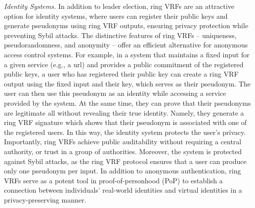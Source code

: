 \smallskip
\emph{Identity Systems.} In addition to leader election, ring VRFs are an attractive option for identity systems, where users can register their public keys and generate pseudonyms using ring VRF outputs, ensuring privacy protection while preventing Sybil attacks.  The distinctive features of ring VRFs -- uniqueness, pseudorandomness, and anonymity -- offer an efficient alternative for anonymous access control systems. For example, in a system that maintains a fixed input for a given service (e.g., a url) and provides a public commitment of the registered public keys, a user who has registered their public key can create a ring VRF output using the fixed input and their key, which serves as their pseudonym.  The user can then use this pseudonym as an identity while accessing a service provided by the system. At the same time, they can prove that their pseudonyms are legitimate all without revealing their true identity. Namely, they generate a ring VRF signature which shows that their pseudonym is associated with one of the registered users. In this way, the identity system protects the user's privacy. 
Importantly, ring VRFs achieve public auditability without requiring a central authority, or trust in a group of authorities.
Moreover, the system is protected against Sybil attacks, as the ring VRF protocol ensures that a user can produce only one pseudonym per input. 
In addition to anonymous authentication, ring VRFs serve as a potent tool in proof-of-personhood (PoP) \cite{pop2008,pop2017,pop2020} to establish a connection between individuals' real-world identities and virtual identities in a privacy-preserving manner.
